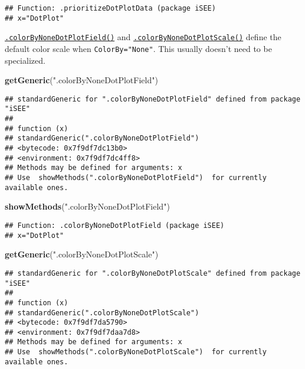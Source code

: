 \documentclass[
]{book}
\newenvironment{Shaded}{\begin{snugshade}}{\end{snugshade}}
\newcommand{\KeywordTok}[1]{\textcolor[rgb]{0.13,0.29,0.53}{\textbf{#1}}}
\newcommand{\NormalTok}[1]{#1}
\newcommand{\StringTok}[1]{\textcolor[rgb]{0.31,0.60,0.02}{#1}}
\begin{document}
\begin{verbatim}
## Function: .prioritizeDotPlotData (package iSEE)
## x="DotPlot"
\end{verbatim}

\href{https://isee.github.io/iSEE/reference/plot-generics.html}{\texttt{.colorByNoneDotPlotField()}} and \href{https://isee.github.io/iSEE/reference/plot-generics.html}{\texttt{.colorByNoneDotPlotScale()}} define the default color scale when \texttt{ColorBy="None"}.
This usually doesn't need to be specialized.

\begin{Shaded}
\begin{Highlighting}[]
\KeywordTok{getGeneric}\NormalTok{(}\StringTok{".colorByNoneDotPlotField"}\NormalTok{)}
\end{Highlighting}
\end{Shaded}

\begin{verbatim}
## standardGeneric for ".colorByNoneDotPlotField" defined from package "iSEE"
## 
## function (x) 
## standardGeneric(".colorByNoneDotPlotField")
## <bytecode: 0x7f9df7dc13b0>
## <environment: 0x7f9df7dc4ff8>
## Methods may be defined for arguments: x
## Use  showMethods(".colorByNoneDotPlotField")  for currently available ones.
\end{verbatim}

\begin{Shaded}
\begin{Highlighting}[]
\KeywordTok{showMethods}\NormalTok{(}\StringTok{".colorByNoneDotPlotField"}\NormalTok{)}
\end{Highlighting}
\end{Shaded}

\begin{verbatim}
## Function: .colorByNoneDotPlotField (package iSEE)
## x="DotPlot"
\end{verbatim}

\begin{Shaded}
\begin{Highlighting}[]
\KeywordTok{getGeneric}\NormalTok{(}\StringTok{".colorByNoneDotPlotScale"}\NormalTok{)}
\end{Highlighting}
\end{Shaded}

\begin{verbatim}
## standardGeneric for ".colorByNoneDotPlotScale" defined from package "iSEE"
## 
## function (x) 
## standardGeneric(".colorByNoneDotPlotScale")
## <bytecode: 0x7f9df7da5790>
## <environment: 0x7f9df7daa7d8>
## Methods may be defined for arguments: x
## Use  showMethods(".colorByNoneDotPlotScale")  for currently available ones.
\end{verbatim}
\end{document}
